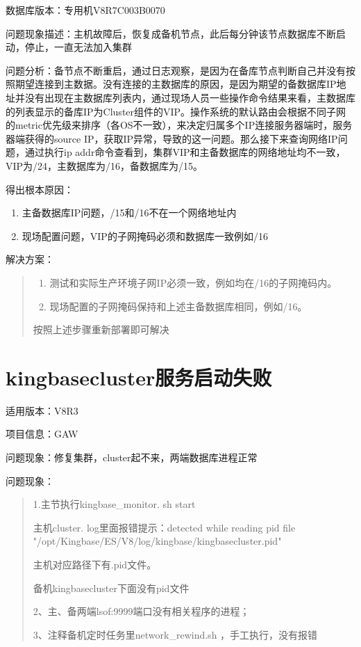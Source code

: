 \documentclass[a4,10pt,oneside,english]{sphinxmanual}
\begin{document}
数据库版本：专用机V8R7C003B0070

问题现象描述：主机故障后，恢复成备机节点，此后每分钟该节点数据库不断启动，停止，一直无法加入集群

问题分析：备节点不断重启，通过日志观察，是因为在备库节点判断自己并没有按照期望连接到主数据。没有连接的主数据库的原因，是因为期望的备数据库IP地址并没有出现在主数据库列表内，通过现场人员一些操作命令结果来看，主数据库的列表显示的备库IP为Cluster组件的VIP。操作系统的默认路由会根据不同子网的metric优先级来排序（各OS不一致），来决定归属多个IP连接服务器端时，服务器端获得的source IP，获取IP异常，导致的这一问题。那么接下来查询网络IP问题，通过执行ip addr命令查看到，集群VIP和主备数据库的网络地址均不一致，VIP为/24，主数据库为/16，备数据库为/15。

得出根本原因：
\begin{enumerate}
%
\item {} 
主备数据库IP问题，/15和/16不在一个网络地址内

\item {} 
现场配置问题，VIP的子网掩码必须和数据库一致例如/16

\end{enumerate}

解决方案：
\begin{quote}
\begin{enumerate}
%
\item {} 
测试和实际生产环境子网IP必须一致，例如均在/16的子网掩码内。

\item {} 
现场配置的子网掩码保持和上述主备数据库相同，例如/16。

\end{enumerate}

按照上述步骤重新部署即可解决
\end{quote}


\section{kingbasecluster服务启动失败}
\label{\detokenize{cluster_faq:kingbasecluster}}
适用版本：V8R3

项目信息：GAW

问题现象：修复集群，cluster起不来，两端数据库进程正常

问题现象：
\begin{quote}

1.主节执行kingbase\_monitor. sh start

主机cluster. log里面报错提示：detected while reading pid file "/opt/Kingbase/ES/V8/log/kingbase/kingbasecluster.pid"

主机对应路径下有.pid文件。

备机kingbasecluster下面没有pid文件

2、主、备两端lsof:9999端口没有相关程序的进程；

3、注释备机定时任务里network\_rewind.sh ，手工执行，没有报错
\end{quote}
\end{document}
